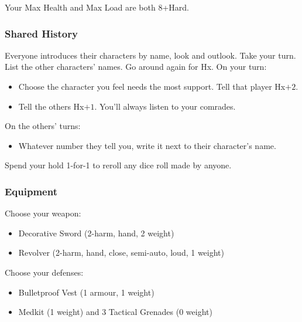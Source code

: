 Your Max Health and Max Load are both 8+Hard.

\subsubsection{Shared History}
Everyone introduces their characters by name, look and outlook. Take
your turn. List the other characters' names. Go around again for
Hx. On your turn:
\begin{itemize} %
\item Choose the character you feel needs the most support. Tell that player Hx$+2$.
\item Tell the others Hx$+1$. You'll always listen to your comrades.
\end{itemize}
On the others’ turns:
\begin{itemize} %
\item Whatever number they tell you, write it next to their
  character’s name.
\end{itemize}


           
Spend your hold 1-for-1 to reroll any dice roll made by anyone.

\subsubsection{Equipment}
Choose your weapon:
\begin{itemize}
\item Decorative Sword (2-harm, hand, 2 weight)
\item Revolver (2-harm, hand, close, semi-auto, loud, 1 weight)
\end{itemize}

Choose your defenses:
\begin{itemize}
\item Bulletproof Vest (1 armour, 1 weight)
\item Medkit (1 weight) and 3 Tactical Grenades (0 weight)
\end{itemize}

